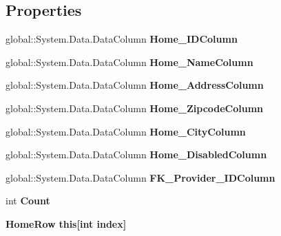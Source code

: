 \subsection*{Properties}
\begin{DoxyCompactItemize}
\item 
\mbox{\label{class_a_f_h___scheduler_1_1_home_inspection_db_data_set_1_1_home_data_table_a655622d0424122f97338381c40f56f55}} 
global\+::\+System.\+Data.\+Data\+Column {\bfseries Home\+\_\+\+I\+D\+Column}\hspace{0.3cm}{\ttfamily  [get]}
\item 
\mbox{\label{class_a_f_h___scheduler_1_1_home_inspection_db_data_set_1_1_home_data_table_ac364c942a89ea6b3e86faedeeb74f77e}} 
global\+::\+System.\+Data.\+Data\+Column {\bfseries Home\+\_\+\+Name\+Column}\hspace{0.3cm}{\ttfamily  [get]}
\item 
\mbox{\label{class_a_f_h___scheduler_1_1_home_inspection_db_data_set_1_1_home_data_table_a5f3d053e96d0ab4c9ea5ccb6e5bd0b5e}} 
global\+::\+System.\+Data.\+Data\+Column {\bfseries Home\+\_\+\+Address\+Column}\hspace{0.3cm}{\ttfamily  [get]}
\item 
\mbox{\label{class_a_f_h___scheduler_1_1_home_inspection_db_data_set_1_1_home_data_table_a7d430c77fdb8b1af13f8e8d3c37063a6}} 
global\+::\+System.\+Data.\+Data\+Column {\bfseries Home\+\_\+\+Zipcode\+Column}\hspace{0.3cm}{\ttfamily  [get]}
\item 
\mbox{\label{class_a_f_h___scheduler_1_1_home_inspection_db_data_set_1_1_home_data_table_a04e037832b44e4fb6c1baf2eada28b04}} 
global\+::\+System.\+Data.\+Data\+Column {\bfseries Home\+\_\+\+City\+Column}\hspace{0.3cm}{\ttfamily  [get]}
\item 
\mbox{\label{class_a_f_h___scheduler_1_1_home_inspection_db_data_set_1_1_home_data_table_addc047c97073c8745ba30130bc223a21}} 
global\+::\+System.\+Data.\+Data\+Column {\bfseries Home\+\_\+\+Disabled\+Column}\hspace{0.3cm}{\ttfamily  [get]}
\item 
\mbox{\label{class_a_f_h___scheduler_1_1_home_inspection_db_data_set_1_1_home_data_table_a943a5d4c9bdede58e03fa45e032db888}} 
global\+::\+System.\+Data.\+Data\+Column {\bfseries F\+K\+\_\+\+Provider\+\_\+\+I\+D\+Column}\hspace{0.3cm}{\ttfamily  [get]}
\item 
\mbox{\label{class_a_f_h___scheduler_1_1_home_inspection_db_data_set_1_1_home_data_table_ae1b34cdb61f491a68b64544427f638a4}} 
int {\bfseries Count}\hspace{0.3cm}{\ttfamily  [get]}
\item 
\mbox{\label{class_a_f_h___scheduler_1_1_home_inspection_db_data_set_1_1_home_data_table_a9d18765fc5821d59c9dd914f5fb01667}} 
\textbf{ Home\+Row} {\bfseries this[int index]}\hspace{0.3cm}{\ttfamily  [get]}
\end{DoxyCompactItemize}

